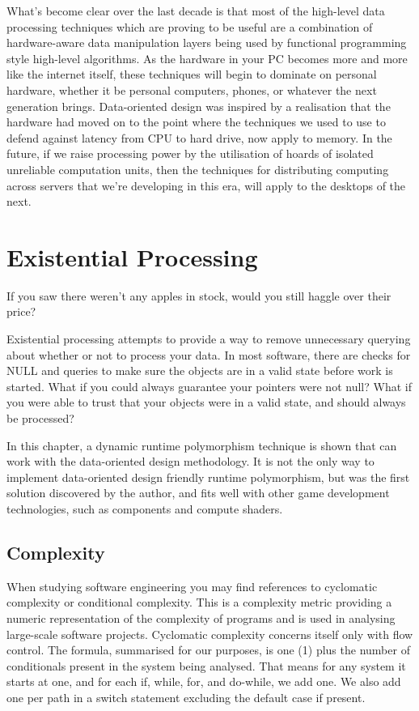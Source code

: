 \documentclass[a4paper,12pt]{book}
\begin{document}
What's become clear over the last decade is that most of the high-level data processing techniques which are proving to be useful are a combination of hardware-aware data manipulation layers being used by functional programming style high-level algorithms. As the hardware in your PC becomes more and more like the internet itself, these techniques will begin to dominate on personal hardware, whether it be personal computers, phones, or whatever the next generation brings. Data-oriented design was inspired by a realisation that the hardware had moved on to the point where the techniques we used to use to defend against latency from CPU to hard drive, now apply to memory. In the future, if we raise processing power by the utilisation of hoards of isolated unreliable computation units, then the techniques for distributing computing across servers that we're developing in this era, will apply to the desktops of the next.

\section{Existential Processing}

If you saw there weren't any apples in stock, would you still haggle over their price?

Existential processing attempts to provide a way to remove unnecessary querying about whether or not to process your data.
In most software, there are checks for NULL and queries to make sure the objects are in a valid state before work is started.
What if you could always guarantee your pointers were not null?
What if you were able to trust that your objects were in a valid state, and should always be processed?

In this chapter, a dynamic runtime polymorphism technique is shown that can work with the data-oriented design methodology.
It is not the only way to implement data-oriented design friendly runtime polymorphism, but was the first solution discovered by the author, and fits well with other game development technologies, such as components and compute shaders.

\subsection{Complexity}

When studying software engineering you may find references to cyclomatic complexity or conditional complexity.
This is a complexity metric providing a numeric representation of the complexity of programs and is used in analysing large-scale software projects.
Cyclomatic complexity concerns itself only with flow control.
The formula, summarised for our purposes, is one (1) plus the number of conditionals present in the system being analysed.
That means for any system it starts at one, and for each if, while, for, and do-while, we add one.
We also add one per path in a switch statement excluding the default case if present.
\end{document}

